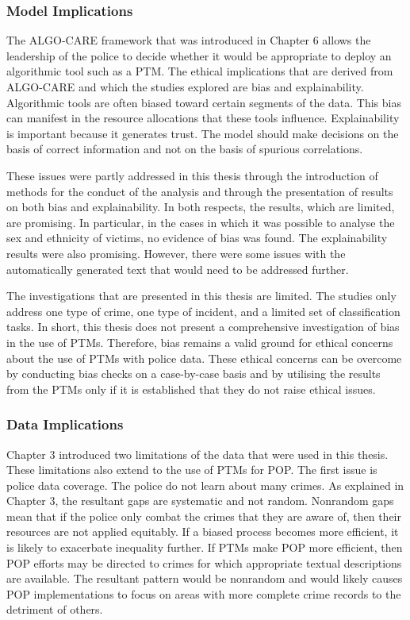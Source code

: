 \subsubsection{Model Implications}  The ALGO-CARE framework that was introduced in Chapter 6 allows the leadership of the police to decide whether it would be appropriate to deploy an algorithmic tool such as a PTM. The ethical implications that are derived from ALGO-CARE and which the studies explored are bias and explainability. Algorithmic tools are often biased toward certain segments of the data. This bias can manifest in the resource allocations that these tools influence. Explainability is important because it generates trust. The model should make decisions on the basis of correct information and not on the basis of spurious correlations.  

These issues were partly addressed in this thesis through the introduction of methods for the conduct of the analysis and through the presentation of results on both bias and explainability. In both respects, the results, which are limited, are promising. In particular, in the cases in which it was possible to analyse the sex and ethnicity of victims, no evidence of bias was found. The explainability results were also promising. However, there were some issues with the automatically generated text that would need to be addressed further.

The investigations that are presented in this thesis are limited. The studies only address one type of crime, one type of incident, and a limited set of classification tasks. In short, this thesis does not present a comprehensive investigation of bias in the use of PTMs. Therefore, bias remains a valid ground for ethical concerns about the use of PTMs with police data. These ethical concerns can be overcome by conducting bias checks on a case-by-case basis and by utilising the results from the PTMs only if it is established that they do not raise ethical issues.

\subsubsection{Data Implications} Chapter 3 introduced two limitations of the data that were used in this thesis. These limitations also extend to the use of PTMs for POP. The first issue is police data coverage. The police do not learn about many crimes. As explained in Chapter 3, the resultant gaps are systematic and not random. Nonrandom gaps mean that if the police only combat the crimes that they are aware of, then their resources are not applied equitably. If a biased process becomes more efficient, it is likely to exacerbate inequality further. If PTMs make POP more efficient, then POP efforts may be directed to crimes for which appropriate textual descriptions are available. The resultant pattern would be nonrandom and would likely causes POP implementations to focus on areas with more complete crime records to the detriment of others.


